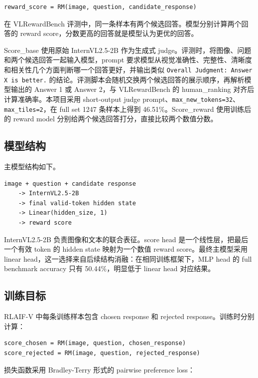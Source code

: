 \documentclass[11pt,a4paper]{ctexart}
\begin{document}
\begin{lstlisting}
reward_score = RM(image, question, candidate_response)
\end{lstlisting}

在 VLRewardBench 评测中，同一条样本有两个候选回答。模型分别计算两个回答的 reward score，分数更高的回答就是模型认为更优的回答。

Score\_base 使用原始 InternVL2.5-2B 作为生成式 judge。评测时，将图像、问题和两个候选回答一起输入模型，prompt 要求模型从视觉准确性、完整性、清晰度和相关性几个方面判断哪一个回答更好，并输出类似 \texttt{Overall Judgment: Answer X is better.} 的结论。评测脚本会随机交换两个候选回答的展示顺序，再解析模型输出的 Answer 1 或 Answer 2，与 VLRewardBench 的 human\_ranking 对齐后计算准确率。本项目采用 short-output judge prompt、\texttt{max\_new\_tokens=32}、\texttt{max\_tiles=2}，在 full set 1247 条样本上得到 46.51\%。Score\_reward 使用训练后的 reward model 分别给两个候选回答打分，直接比较两个数值分数。

\subsection{模型结构}

主模型结构如下。

\begin{lstlisting}
image + question + candidate response
    -> InternVL2.5-2B
    -> final valid-token hidden state
    -> Linear(hidden_size, 1)
    -> reward score
\end{lstlisting}

InternVL2.5-2B 负责图像和文本的联合表征。score head 是一个线性层，把最后一个有效 token 的 hidden state 映射为一个数值 reward score。最终主模型采用 linear head，这一选择来自后续结构消融：在相同训练框架下，MLP head 的 full benchmark accuracy 只有 50.44\%，明显低于 linear head 对应结果。

\subsection{训练目标}

RLAIF-V 中每条训练样本包含 chosen response 和 rejected response。训练时分别计算：

\begin{lstlisting}
score_chosen = RM(image, question, chosen_response)
score_rejected = RM(image, question, rejected_response)
\end{lstlisting}

损失函数采用 Bradley-Terry 形式的 pairwise preference loss：
\end{document}
